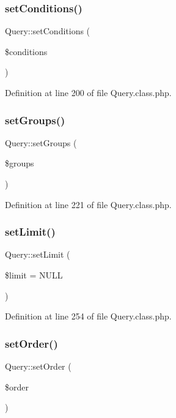\subsubsection{\texorpdfstring{set\+Conditions()}{setConditions()}}
{\footnotesize\ttfamily Query\+::set\+Conditions (\begin{DoxyParamCaption}\item[{}]{\$conditions }\end{DoxyParamCaption})}



Definition at line 200 of file Query.\+class.\+php.

\mbox{\label{classQuery_ab32d5ecb27ebf9facac7ba9c28fc22f6}} 
\subsubsection{\texorpdfstring{set\+Groups()}{setGroups()}}
{\footnotesize\ttfamily Query\+::set\+Groups (\begin{DoxyParamCaption}\item[{}]{\$groups }\end{DoxyParamCaption})}



Definition at line 221 of file Query.\+class.\+php.

\mbox{\label{classQuery_a16a55fd5666868a39a7a93f7b98d4de0}} 
\subsubsection{\texorpdfstring{set\+Limit()}{setLimit()}}
{\footnotesize\ttfamily Query\+::set\+Limit (\begin{DoxyParamCaption}\item[{}]{\$limit = {\ttfamily NULL} }\end{DoxyParamCaption})}



Definition at line 254 of file Query.\+class.\+php.

\mbox{\label{classQuery_a712d4ae76fa0efafa198d2e1fe23a222}} 
\subsubsection{\texorpdfstring{set\+Order()}{setOrder()}}
{\footnotesize\ttfamily Query\+::set\+Order (\begin{DoxyParamCaption}\item[{}]{\$order }\end{DoxyParamCaption})}



